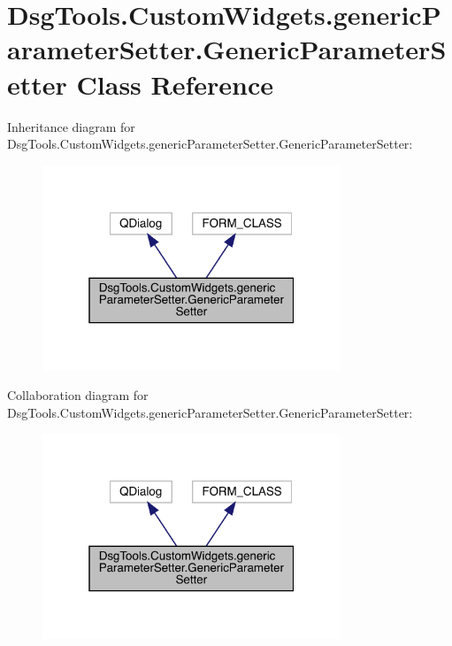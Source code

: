 \hypertarget{class_dsg_tools_1_1_custom_widgets_1_1generic_parameter_setter_1_1_generic_parameter_setter}{}\section{Dsg\+Tools.\+Custom\+Widgets.\+generic\+Parameter\+Setter.\+Generic\+Parameter\+Setter Class Reference}
\label{class_dsg_tools_1_1_custom_widgets_1_1generic_parameter_setter_1_1_generic_parameter_setter}


Inheritance diagram for Dsg\+Tools.\+Custom\+Widgets.\+generic\+Parameter\+Setter.\+Generic\+Parameter\+Setter\+:
\nopagebreak
\begin{figure}[H]
\begin{center}
\leavevmode
\includegraphics[width=253pt]{class_dsg_tools_1_1_custom_widgets_1_1generic_parameter_setter_1_1_generic_parameter_setter__inherit__graph}
\end{center}
\end{figure}


Collaboration diagram for Dsg\+Tools.\+Custom\+Widgets.\+generic\+Parameter\+Setter.\+Generic\+Parameter\+Setter\+:
\nopagebreak
\begin{figure}[H]
\begin{center}
\leavevmode
\includegraphics[width=253pt]{class_dsg_tools_1_1_custom_widgets_1_1generic_parameter_setter_1_1_generic_parameter_setter__coll__graph}
\end{center}
\end{figure}
